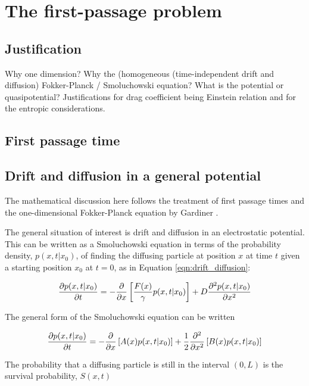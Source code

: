 \chapter{The first-passage problem}
\label{first_passage}

\section{Justification}

Why one dimension?  Why the (homogeneous (time-independent drift and diffusion) Fokker-Planck / Smoluchowski equation?  What is the potential or quasipotential?  Justifications for drag coefficient being Einstein relation and for the entropic considerations.

\section{First passage time}


\section{Drift and diffusion in a general potential}

The mathematical discussion here follows the treatment of first passage times and the one-dimensional Fokker-Planck equation by Gardiner \citep{Gardiner1985}.

The general situation of interest is drift and diffusion in an electrostatic potential.  This can be written as a Smoluchowski equation in terms of the probability density, $p(x,t \lvert x_0)$, of finding the diffusing particle at position $x$ at time $t$ given a starting position $x_0$ at $t=0$, as in Equation \ref{eqn:drift_diffusion}:

\begin{equation}
\frac{\partial p(x,t|x_0)}{\partial t} = -\frac{\partial}{\partial x} \left[ \frac{F(x)}{\gamma} p(x,t|x_0) \right] + D \frac{\partial^2 p(x,t|x_0)}{\partial x^2}
\label{eqn:drift_diffusion_copy}
\end{equation}

The general form of the Smoluchowski equation can be written

\begin{equation}
\frac{\partial p(x,t|x_0)}{\partial t} = - \frac{\partial}{\partial x} \left[ A(x) p(x,t|x_0) \right] + \frac{1}{2} \frac{\partial^2 }{\partial x^2} \left[ B(x) p(x,t|x_0) \right]
\label{eqn:smoluchowski}
\end{equation}

The probability that a diffusing particle is still in the interval $(0,L)$ is the survival probability, $S(x,t)$

